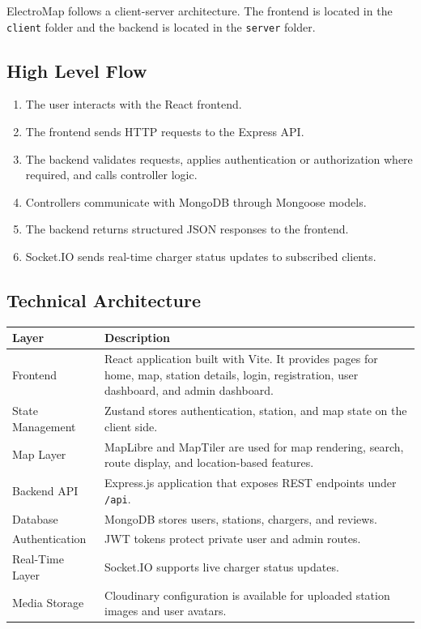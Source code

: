 \documentclass[12pt,a4paper]{article}
\begin{document}
ElectroMap follows a client-server architecture. The frontend is located in the \texttt{client} folder and the backend is located in the \texttt{server} folder.

\subsection{High Level Flow}

\begin{enumerate}
  \item The user interacts with the React frontend.
  \item The frontend sends HTTP requests to the Express API.
  \item The backend validates requests, applies authentication or authorization where required, and calls controller logic.
  \item Controllers communicate with MongoDB through Mongoose models.
  \item The backend returns structured JSON responses to the frontend.
  \item Socket.IO sends real-time charger status updates to subscribed clients.
\end{enumerate}

\subsection{Technical Architecture}

\begin{longtable}{p{4cm}p{10cm}}
\toprule
\textbf{Layer} & \textbf{Description} \\
\midrule
Frontend & React application built with Vite. It provides pages for home, map, station details, login, registration, user dashboard, and admin dashboard. \\
State Management & Zustand stores authentication, station, and map state on the client side. \\
Map Layer & MapLibre and MapTiler are used for map rendering, search, route display, and location-based features. \\
Backend API & Express.js application that exposes REST endpoints under \texttt{/api}. \\
Database & MongoDB stores users, stations, chargers, and reviews. \\
Authentication & JWT tokens protect private user and admin routes. \\
Real-Time Layer & Socket.IO supports live charger status updates. \\
Media Storage & Cloudinary configuration is available for uploaded station images and user avatars. \\
\bottomrule
\end{longtable}
\end{document}
